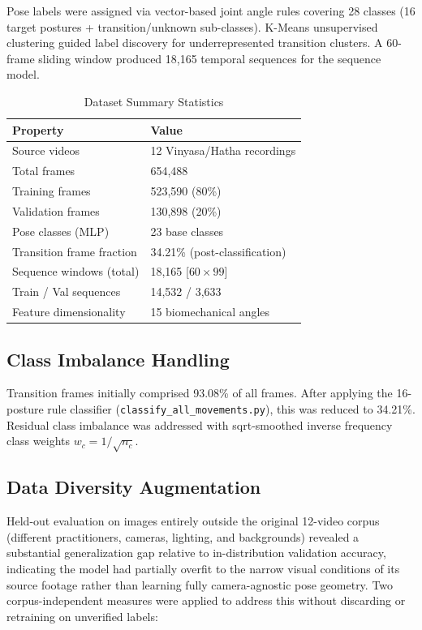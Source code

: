 \documentclass[conference]{IEEEtran}
\begin{document}
Pose labels were assigned via vector-based joint angle rules covering 28 classes
(16 target postures + transition/unknown sub-classes). K-Means unsupervised clustering
guided label discovery for underrepresented transition clusters. A 60-frame sliding
window produced 18,165 temporal sequences for the sequence model.

\begin{table}[ht]
\centering
\caption{Dataset Summary Statistics}
\label{tab:dataset}
\begin{tabular}{@{}ll@{}}
\toprule
\textbf{Property} & \textbf{Value} \\
\midrule
Source videos & 12 Vinyasa/Hatha recordings \\
Total frames & 654,488 \\
Training frames & 523,590 (80\%) \\
Validation frames & 130,898 (20\%) \\
Pose classes (MLP) & 23 base classes \\
Transition frame fraction & 34.21\% (post-classification) \\
Sequence windows (total) & 18,165 [$60\times99$] \\
Train / Val sequences & 14,532 / 3,633 \\
Feature dimensionality & 15 biomechanical angles \\
\bottomrule
\end{tabular}
\end{table}

\subsection{Class Imbalance Handling}

Transition frames initially comprised 93.08\% of all frames. After applying the
16-posture rule classifier (\texttt{classify\_all\_movements.py}), this was reduced to
34.21\%. Residual class imbalance was addressed with sqrt-smoothed inverse frequency
class weights $w_c = 1/\sqrt{n_c}$.

\subsection{Data Diversity Augmentation}
\label{sec:diversity}

Held-out evaluation on images entirely outside the original 12-video corpus (different
practitioners, cameras, lighting, and backgrounds) revealed a substantial generalization
gap relative to in-distribution validation accuracy, indicating the model had partially
overfit to the narrow visual conditions of its source footage rather than learning fully
camera-agnostic pose geometry. Two corpus-independent measures were applied to address
this without discarding or retraining on unverified labels:
\end{document}
